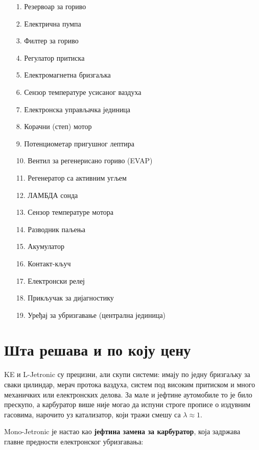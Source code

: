 \documentclass[12pt]{article}
\begin{document}
\begin{kljucno}

      \begin{enumerate}[noitemsep]
    \item[1.] Резервоар за гориво
    \item[2.] Електрична пумпа
    \item[3.] Филтер за гориво
    \item[4.] Регулатор притиска
    \item[5.] Електромагнетна бризгаљка
    \item[6.] Сензор температуре усисаног ваздуха
    \item[7.] Електронска управљачка јединица
    \item[8.] Корачни (степ) мотор
    \item[9.] Потенциометар пригушног лептира
    \item[10.] Вентил за регенерисано гориво (EVAP)
    \item[11.] Регенератор са активним угљем
    \item[12.] ЛАМБДА сонда
    \item[13.] Сензор температуре мотора
    \item[14.] Разводник паљења
    \item[15.] Акумулатор
    \item[16.] Контакт-кључ
    \item[17.] Електронски релеј
    \item[18.] Прикључак за дијагностику
    \item[19.] Уређај за убризгавање (централна јединица)
\end{enumerate}
      
\end{kljucno}

\section{Шта решава и по коју цену}

KE и L-Jetronic су прецизни, али скупи системи: имају по једну бризгаљку за сваки
цилиндар, мерач протока ваздуха, систем под високим притиском и много
механичких или електронских делова. За мале и јефтине аутомобиле то је било
прескупо, а карбуратор више није могао да испуни строге прописе о издувним
гасовима, нарочито уз катализатор, који тражи смешу са $\lambda \approx 1$.

Mono-Jetronic је настао као \textbf{јефтина замена за карбуратор}, која задржава
главне предности електронског убризгавања:
\end{document}
